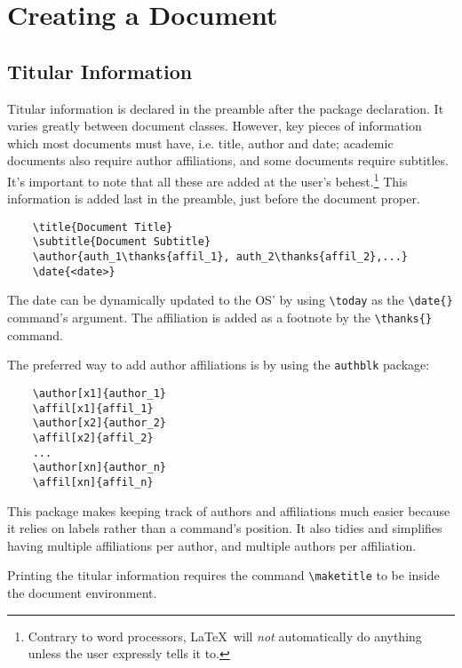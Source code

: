 \chapter{Creating a Document}
\section{Titular Information}
%
Titular information is declared in the preamble after the package declaration. It varies greatly between document classes. However, key pieces of information which most documents must have, i.e. title, author and date; academic documents also require author affiliations, and some documents require subtitles. It's important to note that all these are added at the user's behest.\footnote{Contrary to word processors, \LaTeX~will \emph{not} automatically do anything unless the user expressly tells it to.} This information is added last in the preamble, just before the document proper.
\begin{verbatim}
	\title{Document Title}
	\subtitle{Document Subtitle}
	\author{auth_1\thanks{affil_1}, auth_2\thanks{affil_2},...}
	\date{<date>}
\end{verbatim}
The date can be dynamically updated to the OS' by using \verb|\today| as the \verb|\date{}| command's argument. The affiliation is added as a footnote by the \verb|\thanks{}| command. 

The preferred way to add author affiliations is by using the \verb|authblk| package:
\begin{verbatim}
	\author[x1]{author_1}
	\affil[x1]{affil_1}
	\author[x2]{author_2}
	\affil[x2]{affil_2}
	...
	\author[xn]{author_n}
	\affil[xn]{affil_n}
\end{verbatim}
This package makes keeping track of authors and affiliations much easier because it relies on labels rather than a command's position. It also tidies and simplifies having multiple affiliations per author, and multiple authors per affiliation.

Printing the titular information requires the command \verb|\maketitle| to be inside the document environment.
%
